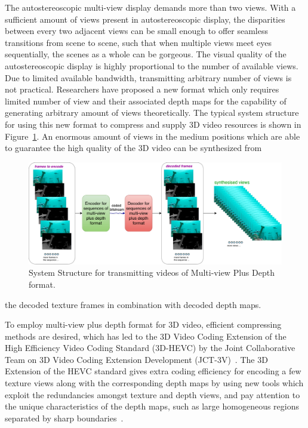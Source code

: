 The autostereoscopic multi-view display demands more than two views.
With a sufficient amount of views present in autostereoscopic display, the
disparities between every two adjacent views can be small enough to offer
seamless transitions from scene to scene, such that when multiple views
meet eyes sequentially, the scenes as a whole can be gorgeous.
The visual quality of the autostereoscopic display is highly proportional to
the number of available views.
Due to limited available bandwidth, transmitting arbitrary number of views
is not practical.
Researchers have proposed a new format which only requires limited number
of view and their associated depth maps for the capability of
generating arbitrary amount of views theoretically.
The typical system structure for using this new format to compress and supply 3D video
resources is shown in Figure~\ref{fig:SS-MVD}.
An enormous amount of views in the medium positions which are able to
guarantee the high quality of the 3D video can be synthesized from
\begin{figure}[!b]
    \centering
    \includegraphics[width=\textwidth,height=\textheight,keepaspectratio]{Figures/SystemStructureOf3DEncoder}
    \caption[System Structure for transmitting videos of Multi-view Plus Depth format]{System Structure for transmitting videos of Multi-view Plus Depth format.}
    \label{fig:SS-MVD}
\end{figure}
the decoded texture frames in combination with decoded depth maps.

To employ multi-view plus depth format for 3D video, efficient compressing
methods are desired, which has led to the 3D Video Coding Extension of the
High Efficiency Video Coding Standard (3D-HEVC) by the Joint Collaborative Team
on 3D Video Coding Extension Development (JCT-3V)~\parencite{RN195}.
The 3D Extension of the HEVC standard gives extra coding efficiency
for encoding a few texture views along with the corresponding depth maps by
using new tools which exploit the redundancies amongst
texture and depth views, and pay attention to the unique characteristics of
the depth maps, such as large homogeneous
regions separated by sharp boundaries~\parencite{RN47}.

